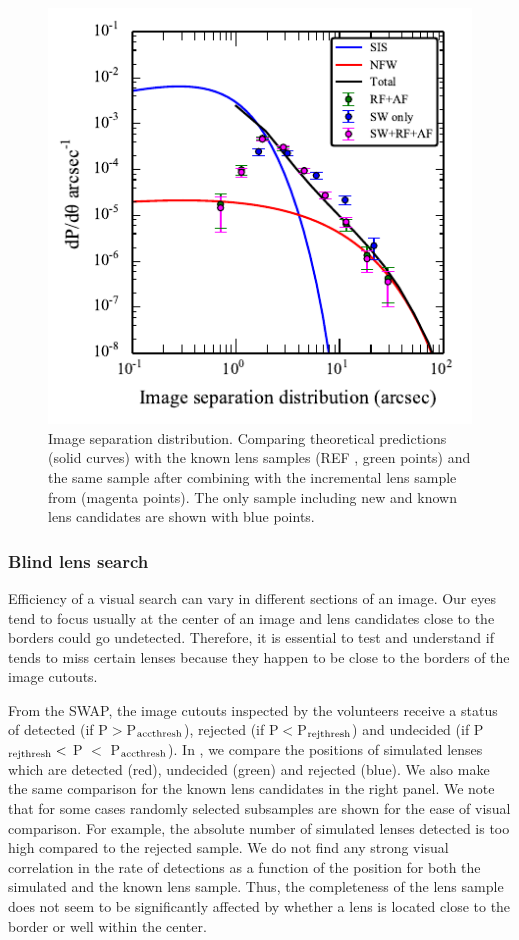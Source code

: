 \documentclass[useAMS,usenatbib,a4paper]{mn2e}
\begin{document}
\begin{figure}
\begin{center}
\includegraphics[scale=1.2]{sw-cfhtls-figs/isd_cfhtls_sw.pdf}
\caption{ \label{fig:isd} Image separation distribution. Comparing
theoretical predictions (solid curves) with the \cfhtls known lens
samples (REF , green points) and the same \cfhtls sample after combining
with the incremental lens sample from \sw (magenta points). The \sw only
sample including new and known lens candidates are shown with blue
points. }
\end{center}
\end{figure}

\subsubsection{Blind lens search}
Efficiency of a visual search can vary in different sections of an
image. Our eyes tend to focus usually at the center of an image and lens
candidates close to the borders could go undetected. Therefore, it is
essential to test and understand if \sw tends to miss certain lenses
because they happen to be close to the borders of the image cutouts.
 
From the SWAP, the image cutouts inspected by the \sw volunteers receive
a status of detected (if P$>$P$_{\rm acc thresh}$), rejected (if
P$<$P$_{\rm rej thresh}$) and undecided (if P$_{\rm rej thresh}<$ P
$<$ P$_{\rm acc thresh}$). In , we compare the
positions of simulated lenses which are detected (red), undecided
(green) and rejected (blue). We also make the same comparison for the
known lens candidates in the right panel.  We note that for some cases
randomly selected subsamples are shown for the ease of visual
comparison. For example, the absolute number of simulated lenses
detected is too high compared to the rejected sample. We do not find any
strong visual correlation in the rate of detections as a function of the
position for both the simulated and the known lens sample. Thus, the
completeness of the lens sample does not seem to be significantly
affected by whether a lens is located close to the border or well within
the center.
\end{document}
